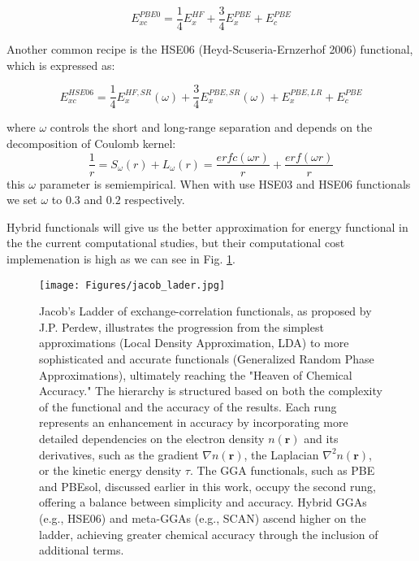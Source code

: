 \begin{equation}
	E_{xc}^{PBE0} = \dfrac{1}{4}E_{x}^{HF} + \dfrac{3}{4} E_{x}^{PBE}+E_{c}^{PBE}
\end{equation}


Another common recipe is the HSE06 (Heyd-Scuseria-Ernzerhof 2006) functional, which is expressed as:

\begin{equation}
	E_{xc}^{HSE06} = \dfrac{1}{4}E_{x}^{HF,SR}(\omega) + \dfrac{3}{4} E_{x}^{PBE,SR}(\omega) +E_{x}^{PBE,LR}+E_{c}^{PBE}
\end{equation}

where $\omega$ controls the short and long-range separation and depends on the decomposition of Coulomb kernel:
\begin{equation}
	\dfrac{1}{r} = S_{\omega} (r) + L_{\omega} (r) = \dfrac{erfc(\omega r)}{r} + \dfrac{erf(\omega r)}{r}
\end{equation}
this $\omega$ parameter is semiempirical. When with use HSE03 and HSE06 functionals we set $\omega$ to $0.3$ and $0.2$ respectively.


Hybrid functionals will give us the better approximation for energy functional in the the current computational studies, but their computational cost implemenation is high as we can see in Fig. \ref{fig_2.1}.

\begin{figure}[H]
	\texttt{[image: Figures/jacob\_lader.jpg]}
	\centering
	\caption{Jacob's Ladder of exchange-correlation functionals, as proposed by J.P. Perdew, illustrates the progression from the simplest approximations (Local Density Approximation, LDA) to more sophisticated and accurate functionals (Generalized Random Phase Approximations), ultimately reaching the "Heaven of Chemical Accuracy." The hierarchy is structured based on both the complexity of the functional and the accuracy of the results. Each rung represents an enhancement in accuracy by incorporating more detailed dependencies on the electron density \(n(\mathbf{r})\) and its derivatives, such as the gradient \( \nabla n(\mathbf{r}) \), the Laplacian \( \nabla^2 n(\mathbf{r}) \), or the kinetic energy density \( \tau \). The GGA functionals, such as PBE and PBEsol, discussed earlier in this work, occupy the second rung, offering a balance between simplicity and accuracy. Hybrid GGAs (e.g., HSE06) and meta-GGAs (e.g., SCAN) ascend higher on the ladder, achieving greater chemical accuracy through the inclusion of additional terms.}
	
	\label{fig_2.1}
\end{figure}


